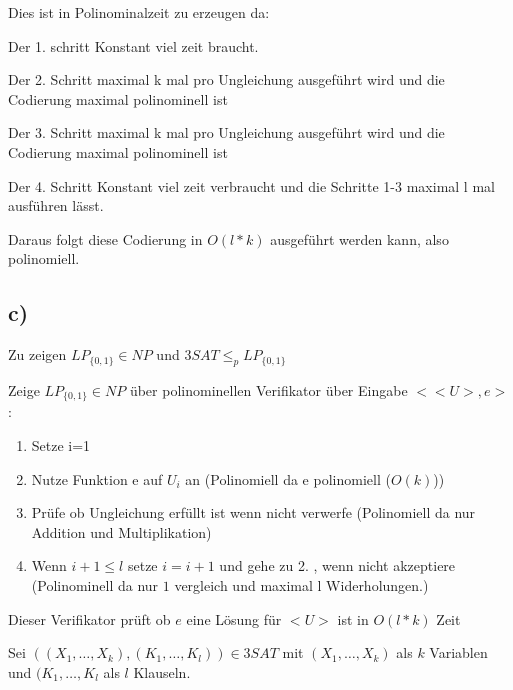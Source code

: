 Dies ist in Polinominalzeit zu erzeugen da:
\begin{list}{-}{}
\item Der 1. schritt Konstant viel zeit braucht.
\item Der 2. Schritt maximal k mal pro Ungleichung ausgeführt wird und die Codierung maximal polinominell ist 
\item Der 3. Schritt maximal k mal pro Ungleichung ausgeführt wird und die Codierung maximal polinominell ist 
\item Der 4. Schritt Konstant viel zeit verbraucht und die Schritte 1-3 maximal l mal ausführen lässt.

\end{list}

 Daraus folgt diese Codierung in $O(l*k)$ ausgeführt werden kann, also polinomiell.
 
\subsection*{c)} 
Zu zeigen $LP_{\{0,1\}} \in NP$ und $3SAT \leq_p LP_{\{0,1\}}$

Zeige $LP_{\{0,1\}} \in NP$ über polinominellen Verifikator über Eingabe $<<U>,e>$:
\begin{enumerate}
\item Setze i=1
\item Nutze Funktion e auf $U_i$ an (Polinomiell da e polinomiell ($O(k)$))
\item Prüfe ob Ungleichung erfüllt ist wenn nicht verwerfe (Polinomiell da nur Addition und Multiplikation)
\item Wenn $i+1 \leq l$ setze $i=i+1$ und gehe zu 2. , wenn nicht akzeptiere (Polinominell da nur $1$ vergleich und maximal l Widerholungen.) 
\end{enumerate}
Dieser Verifikator prüft ob $e$ eine Lösung für $<U>$ ist in $O(l*k)$ Zeit 

Sei $((X_1,\ldots ,X_k),(K_1, \ldots , K_l)) \in 3SAT$ mit $(X_1,\ldots ,X_k)$ als $k$ Variablen und $(K_1, \ldots , K_l$ als $l$ Klauseln. 
